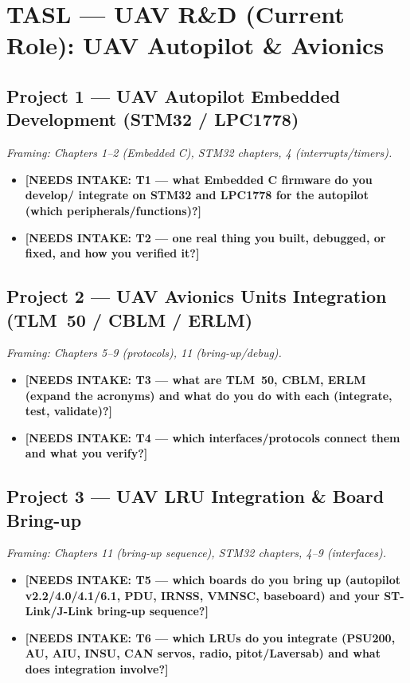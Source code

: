 \section{TASL --- UAV R\&D (Current Role): UAV Autopilot \& Avionics}

\subsection{Project 1 --- UAV Autopilot Embedded Development (STM32 / LPC1778)}
\emph{Framing: Chapters 1--2 (Embedded C), STM32 chapters, 4 (interrupts/timers).}
\begin{itemize}
\item \textbf{[NEEDS INTAKE: T1 --- what Embedded C firmware do you develop/
  integrate on STM32 and LPC1778 for the autopilot (which peripherals/functions)?]}
\item \textbf{[NEEDS INTAKE: T2 --- one real thing you built, debugged, or fixed,
  and how you verified it?]}
\end{itemize}

\subsection{Project 2 --- UAV Avionics Units Integration (TLM~50 / CBLM / ERLM)}
\emph{Framing: Chapters 5--9 (protocols), 11 (bring-up/debug).}
\begin{itemize}
\item \textbf{[NEEDS INTAKE: T3 --- what are TLM~50, CBLM, ERLM (expand the
  acronyms) and what do you do with each (integrate, test, validate)?]}
\item \textbf{[NEEDS INTAKE: T4 --- which interfaces/protocols connect them and
  what you verify?]}
\end{itemize}

\subsection{Project 3 --- UAV LRU Integration \& Board Bring-up}
\emph{Framing: Chapters 11 (bring-up sequence), STM32 chapters, 4--9 (interfaces).}
\begin{itemize}
\item \textbf{[NEEDS INTAKE: T5 --- which boards do you bring up (autopilot
  v2.2/4.0/4.1/6.1, PDU, IRNSS, VMNSC, baseboard) and your ST-Link/J-Link
  bring-up sequence?]}
\item \textbf{[NEEDS INTAKE: T6 --- which LRUs do you integrate (PSU200, AU, AIU,
  INSU, CAN servos, radio, pitot/Laversab) and what does integration involve?]}
\end{itemize}

